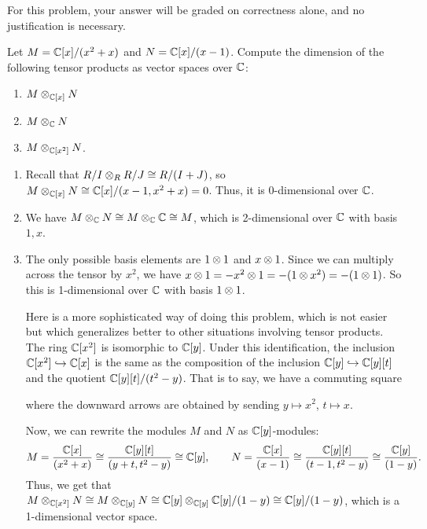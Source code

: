 \begin{question}[subtitle = {August 2017 Problem 1, edited},ID=Aug17_1]
For this problem, your answer will be graded on correctness alone, and no justification is necessary.

Let $M=\mathbb{C}[x]/(x^2+x)$ and $N=\mathbb{C}[x]/(x-1)$. Compute the dimension of the following tensor products as vector spaces over $\mathbb{C}$:
\begin{enumerate}
    \item $M\otimes_{\mathbb{C}[x]} N$
    \item $M\otimes_{\mathbb{C}} N$
    \item $M\otimes_{\mathbb{C}[x^2]} N$.
\end{enumerate}
\end{question}
\begin{solution}
\begin{enumerate}
    \item Recall that $R/I \otimes_R R/J \cong R/(I+J)$, so $M \otimes_{\mathbb{C}[x]} N \cong \mathbb{C}[x]/(x-1,x^2+x) = 0$. Thus, it is 0-dimensional over $\mathbb{C}$.
    \item We have $M \otimes_{\mathbb{C}} N \cong M \otimes_{\mathbb{C}} \mathbb{C} \cong M$, which is 2-dimensional over $\mathbb{C}$ with basis $1,x$.
    \item The only possible basis elements are $1 \otimes 1$ and $x \otimes 1$. Since we can multiply across the tensor by $x^2$, we have $x \otimes 1 = -x^2 \otimes 1 = -(1 \otimes x^2)=-(1\otimes 1)$. So this is 1-dimensional over $\mathbb{C}$ with basis $1 \otimes 1$.

    Here is a more sophisticated way of doing this problem, which is not easier but which generalizes better to other situations involving tensor products. The ring $\mathbb{C}[x^2]$ is isomorphic to $\mathbb{C}[y]$. Under this identification, the inclusion $\mathbb{C}[x^2] \hookrightarrow \mathbb{C}[x]$ is the same as the composition of the inclusion $\mathbb{C}[y] \hookrightarrow \mathbb{C}[y][t]$ and the quotient $\mathbb{C}[y][t]/(t^2-y)$. That is to say, we have a commuting square
    where the downward arrows are obtained by sending $y \mapsto x^2$, $t \mapsto x$.
    
    Now, we can rewrite the modules $M$ and $N$ as $\mathbb{C}[y]$-modules:
    \[M = \frac{\mathbb{C}[x]}{(x^2+x)} \cong \frac{\mathbb{C}[y][t]}{(y+t,t^2-y)} \cong \mathbb{C}[y], \qquad N = \frac{\mathbb{C}[x]}{(x-1)} \cong \frac{\mathbb{C}[y][t]}{(t-1,t^2-y)} \cong \frac{\mathbb{C}[y]}{(1-y)}.\]
    Thus, we get that $M \otimes_{\mathbb{C}[x^2]} N \cong M \otimes_{\mathbb{C}[y]} N \cong \mathbb{C}[y] \otimes_{\mathbb{C}[y]} \mathbb{C}[y]/(1-y) \cong \mathbb{C}[y]/(1-y)$, which is a 1-dimensional vector space.
\end{enumerate}
\end{solution}

